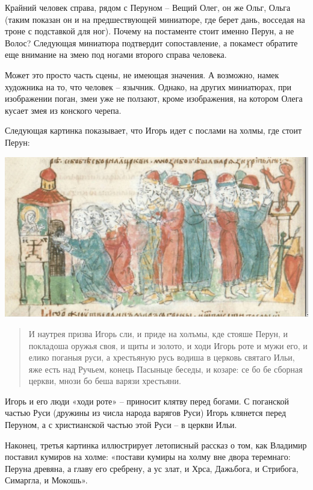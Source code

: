 Крайний человек справа, рядом с Перуном – Вещий Олег, он же Ольг, Ольга (таким показан он и на предшествующей миниатюре, где берет дань, восседая на троне с подставкой для ног). Почему на постаменте стоит именно Перун, а не Волос? Следующая миниатюра подтвердит сопоставление, а покамест обратите еще внимание на змею под ногами второго справа человека.

Может это просто часть сцены, не имеющая значения. А возможно, намек художника на то, что человек – язычник. Однако, на других миниатюрах, при изображении поган, змеи уже не ползают, кроме изображения, на котором Олега кусает змея из конского черепа.

Следующая картинка показывает, что Игорь идет с послами на холмы, где стоит Перун:


\begin{center}
\includegraphics[width=\linewidth]{chast-zmiy/ktotakiezmei/rad-perun-02.jpg}
\end{center}

\begin{quotation}
И наутрея призва Игорь сли, и приде на холъмы, кде стояше Перун, и покладоша оружья своя, и щиты и золото, и ходи Игорь роте и мужи его, и елико поганыя руси, а хрестьяную русь водиша в церковь святаго Ильи, яже есть над Ручьем, конець Пасыньце беседы, и козаре: се бо бе сборная церкви, мнози бо беша варязи хрестьяни.
\end{quotation}


Игорь и его люди «ходи роте» – приносит клятву перед богами. С поганской частью Руси (дружины из числа народа варягов Руси) Игорь клянется перед Перуном, а с христианской частью этой Руси – в церкви Ильи. 

Наконец, третья картинка иллюстрирует летописный рассказ о том, как Владимир поставил кумиров на холме: «постави кумиры на холму вне двора теремнаго: Перуна древяна, а главу его сребрену, а ус злат, и Хрса, Дажьбога, и Стрибога, Симаргла, и Мокошь».

